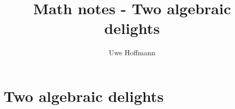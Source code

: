 

\title{Math notes - Two algebraic delights}
\author{Uwe Hoffmann}



\setcounter{chapter}{1}
\chapter*{Two algebraic delights}
